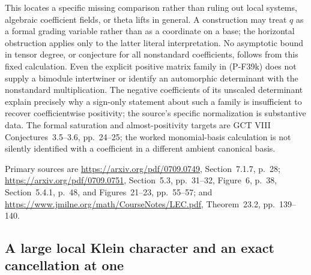 \documentclass[11pt,a4paper]{article}
\begin{document}
This locates a specific missing comparison rather than ruling
out local systems, algebraic coefficient fields, or theta lifts
in general. A construction may treat $q$ as a formal grading
variable rather than as a coordinate on a base; the horizontal
obstruction applies only to the latter literal interpretation.
No asymptotic bound in tensor degree, or conjecture for all
nonstandard coefficients, follows from this fixed calculation.
Even the explicit positive matrix family in (P-F39k) does not
supply a bimodule intertwiner or identify an automorphic
determinant with the nonstandard multiplication. The negative
coefficients of its unscaled determinant explain precisely why
a sign-only statement about such a family is insufficient to
recover coefficientwise positivity; the source's specific
normalization is substantive data.
The formal saturation and almost-positivity targets are
GCT VIII Conjectures~3.5--3.6, pp.~24--25; the worked
monomial-basis calculation is not silently identified with a
coefficient in a different ambient canonical basis.

Primary sources are
\url{https://arxiv.org/pdf/0709.0749}, Section~7.1.7, p.~28;
\url{https://arxiv.org/pdf/0709.0751}, Section~5.3, pp.~31--32,
Figure~6, p.~38, Section~5.4.1, p.~48, and Figures~21--23,
pp.~55--57; and
\url{https://www.jmilne.org/math/CourseNotes/LEC.pdf},
Theorem~23.2, pp.~139--140.


\subsection{A large local Klein character and an exact cancellation at one}
\end{document}
